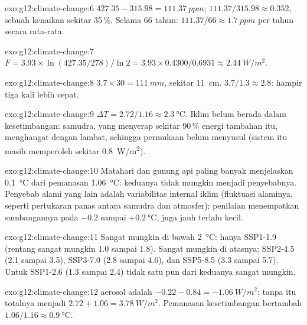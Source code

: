 \begin{solution}{exo:g12:climate-change:6}
$427.35 - 315.98 = \qty{111.37}{ppm}$; $111.37/315.98 \approx 0.352$, sebuah
kenaikan sekitar 35\,\%. Selama 66 tahun: $111.37/66 \approx
\qty{1.7}{ppm}$ per tahun secara rata-rata.
\end{solution}

\begin{solution}{exo:g12:climate-change:7}
$F = 3.93 \times \ln(427.35/278)/\ln 2 = 3.93 \times 0.4300/0.6931 \approx
\qty{2.44}{W/m^2}$.
\end{solution}

\begin{solution}{exo:g12:climate-change:8}
$3.7 \times 30 = \qty{111}{mm}$, sekitar \qty{11}{cm}. $3.7/1.3 \approx 2.8$:
hampir tiga kali lebih cepat.
\end{solution}

\begin{solution}{exo:g12:climate-change:9}
$\Delta T = 2.72/1.16 \approx \qty{2.3}{\degreeCelsius}$. Iklim belum berada
dalam kesetimbangan: samudra, yang menyerap sekitar 90\,\% energi tambahan
itu, menghangat dengan lambat, sehingga permukaan belum menyusul 
(sistem itu masih memperoleh sekitar \qty{0.8}{W/m^2}).
\end{solution}

\begin{solution}{exo:g12:climate-change:10}
Matahari dan gunung api paling banyak menjelaskan \qty{0.1}{\degreeCelsius}
dari pemanasan \qty{1.06}{\degreeCelsius}: keduanya tidak mungkin menjadi
penyebabnya. Penyebab alami yang lain adalah variabilitas internal iklim
(fluktuasi alaminya, seperti pertukaran panas antara samudra dan atmosfer);
penilaian menempatkan sumbangannya pada $-0.2$ sampai $+\qty{0.2}{\degreeCelsius}$,
juga jauh terlalu kecil.
\end{solution}

\begin{solution}{exo:g12:climate-change:11}
Sangat mungkin di bawah \qty{2}{\degreeCelsius}: hanya SSP1-1.9 (rentang
sangat mungkin 1.0 sampai 1.8). Sangat mungkin di atasnya: SSP2-4.5 (2.1
sampai 3.5), SSP3-7.0 (2.8 sampai 4.6), dan SSP5-8.5 (3.3 sampai 5.7). Untuk
SSP1-2.6 (1.3 sampai 2.4) tidak satu pun dari keduanya sangat mungkin.
\end{solution}

\begin{solution}{exo:g12:climate-change:12}
 aerosol adalah $-0.22 - 0.84 = \qty{-1.06}{W/m^2}$; tanpa  itu
totalnya menjadi $2.72 + 1.06 = \qty{3.78}{W/m^2}$. Pemanasan kesetimbangan
bertambah $1.06/1.16 \approx \qty{0.9}{\degreeCelsius}$.
\end{solution}

